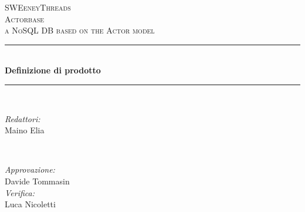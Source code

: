 \documentclass[a4paper]{article}
\begin{document}
	
	\begin{titlepage}
		\newcommand{\HRule}{\rule{\linewidth}{0.5mm}} 
		\center  
		
		\textsc{\LARGE SWEeneyThreads}\\[1.5cm] 
		\textsc{\Large Actorbase}\\[0.5cm] 
		\textsc{\large a NoSQL DB based on the Actor model}\\[0.5cm]
		
		
		\HRule \\[0.4cm]
		{ \huge \bfseries Definizione di prodotto}\\[0.4cm] 
		\HRule \\[1.5cm]
		
		\begin{minipage}{0.4\textwidth}
			\begin{flushleft} \large
				\emph{Redattori:}\\
				Maino Elia \\
			\end{flushleft}
		\end{minipage}
		~
		\begin{minipage}{0.4\textwidth}
			\begin{flushright} \large
				\emph{Approvazione:} \\
                    Davide Tommasin \\
				\emph{Verifica:} \\
                    Luca Nicoletti \\
				 
			\end{flushright}
		\end{minipage}
		

\end{titlepage}
\end{document}
